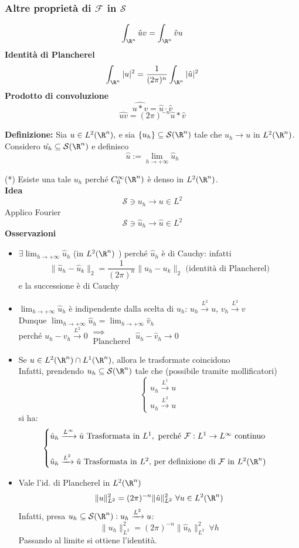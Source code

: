 \subsubsection{Altre proprietà di $\mathcal F$ in $\mathcal S$}
\[ \int_{\R^n}^{} \hat{u}v=\int_{\R^n}^{} \hat{v}u\]
\textbf{Identità di Plancherel} 
\[\int_{\R^n}^{} |u|^2=\frac{1}{(2\pi)^n}\int_{\R^n}^{} |\hat{u}|^2\]
\textbf{Prodotto di convoluzione} 
\[\widehat{u * v}=\hat{u}\cdot \hat{v}\]
\[\widehat{uv}=(2\pi)^{-n}\hat{u}* \hat{v}\]
\divider
\begin{tcolorbox}
	\textbf{Definizione: }Sia $u\in L^{2}(\R^n),$ e sia $\{u_h\} \subseteq  \mathcal S(\R^n)$ tale che $u_h\to u$ in $L^{2}(\R^n)$.\\
	Considero $\hat{u_h}\subseteq  \mathcal S(\R^n)$ e definisco 
	\[\hat{u}:=\lim_{h \to +\infty} \hat{u}_h\]

\end{tcolorbox}
(*) Esiste una tale $u_h$ perché $C_0^\infty(\R^n)$ è denso in $L^{2}(\R^n)$.\\
\textbf{Idea} 
\[\mathcal S\ni u_h\to u\in L^{2}\]
Applico Fourier 
\[\mathcal S \ni  \hat{u}_h\to \hat{ u}\in L^{2}\]
\textbf{Osservazioni} 
\begin{itemize}
	\item $\exists \lim_{h \to +\infty} \hat{u}_h$ (in $L^{2}(\R^n)$ ) perché $\hat{u}_h$ è di Cauchy: infatti
		\[\|\hat{u}_h-\hat{u}_k\|_2=\frac{1}{(2\pi)^n}\|u_h-u_k\|_2\text{ (identità di Plancherel)}\]
		e la successione è di Cauchy
	\item $\lim_{h \to +\infty} \hat{u}_h$ è indipendente dalla scelta di $u_h $: $u_h\xrightarrow{L^2}u$,  $v_h\xrightarrow{L^2}v$ \\Dunque $\lim_{h \to +\infty}\hat{u}_h=\lim_{h \to +\infty} \hat{v}_h $ \\perché $u_h-v_h\xrightarrow{L^2}0\ \substack{\implies \\\text{Plancherel}}\ \hat{u}_h-\hat{v}_h\to 0$
	\item Se $u\in L^{2}(\R^n)\cap L^{1}(\R^n)$, allora le trasformate coincidono
		\\Infatti, prendendo $u_h \subseteq  \mathcal S(\R^n)$ tale che (possibile tramite mollificatori)
		\[\begin{cases}
			u_h\xrightarrow{L^1}u\\
		u_h\xrightarrow{L^2}u
	\end{cases}\]
	si ha:
	\[\begin{cases}
		\hat{u}_h\xrightarrow{L^\infty}\hat{u} \text{ Trasformata in }L^1,\ \text{perché }\mathcal F:L^1\to L^\infty\text{ continuo}\\
		\\ \hat{u}_h\xrightarrow{L^2}\hat{u} \text{ Trasformata in }L^2\text{, per definizione di }\mathcal F\text{ in }L^{2}(\R^n) 
	\end{cases}\]
\item Vale l'id. di Plancherel in $L^{2}(\R^n)$ 
	\[\|u\|_{L^2}^2=(2\pi)^{-n}\|\hat{u}\|^2_{L^2}\ \forall u\in L^{2}(\R^n)\]
	Infatti, presa $u_h \subseteq  \mathcal S(\R^n):u_h\xrightarrow{L^2}u$:
	\[\|u_h\|^2_{L^2}=(2\pi)^{-n}\|\hat{u}_h\|^2_{L^2}\ \forall h\]
	Passando al limite si ottiene l'identità.
\end{itemize}
